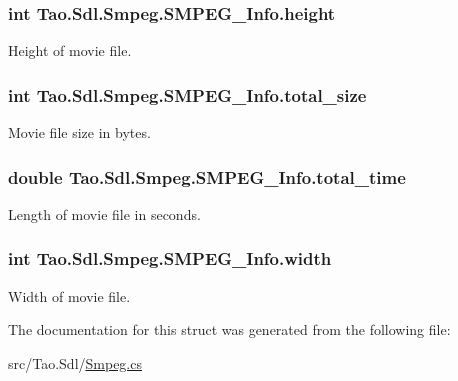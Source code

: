 \label{struct_tao_1_1_sdl_1_1_smpeg_1_1_s_m_p_e_g___info_a1236f01e3011005067459ab30b4d2353}
\hypertarget{struct_tao_1_1_sdl_1_1_smpeg_1_1_s_m_p_e_g___info_ab4c8cb6db1888d1d763dc72c158fd8f3}{
\subsubsection[{height}]{\setlength{\rightskip}{0pt plus 5cm}int {\bf Tao.Sdl.Smpeg.SMPEG\_\-Info.height}}}
\label{struct_tao_1_1_sdl_1_1_smpeg_1_1_s_m_p_e_g___info_ab4c8cb6db1888d1d763dc72c158fd8f3}


Height of movie file. 

\hypertarget{struct_tao_1_1_sdl_1_1_smpeg_1_1_s_m_p_e_g___info_ac5c5e22bebc4d7c6980c1c329316353c}{
\subsubsection[{total\_\-size}]{\setlength{\rightskip}{0pt plus 5cm}int {\bf Tao.Sdl.Smpeg.SMPEG\_\-Info.total\_\-size}}}
\label{struct_tao_1_1_sdl_1_1_smpeg_1_1_s_m_p_e_g___info_ac5c5e22bebc4d7c6980c1c329316353c}


Movie file size in bytes. 

\hypertarget{struct_tao_1_1_sdl_1_1_smpeg_1_1_s_m_p_e_g___info_abc187661fe73006bad98670789d3d756}{
\subsubsection[{total\_\-time}]{\setlength{\rightskip}{0pt plus 5cm}double {\bf Tao.Sdl.Smpeg.SMPEG\_\-Info.total\_\-time}}}
\label{struct_tao_1_1_sdl_1_1_smpeg_1_1_s_m_p_e_g___info_abc187661fe73006bad98670789d3d756}


Length of movie file in seconds. 

\hypertarget{struct_tao_1_1_sdl_1_1_smpeg_1_1_s_m_p_e_g___info_a442b1203f0b9f7b211678c00addb5217}{
\subsubsection[{width}]{\setlength{\rightskip}{0pt plus 5cm}int {\bf Tao.Sdl.Smpeg.SMPEG\_\-Info.width}}}
\label{struct_tao_1_1_sdl_1_1_smpeg_1_1_s_m_p_e_g___info_a442b1203f0b9f7b211678c00addb5217}


Width of movie file. 



The documentation for this struct was generated from the following file:\begin{DoxyCompactItemize}
\item 
src/Tao.Sdl/\hyperlink{_smpeg_8cs}{Smpeg.cs}\end{DoxyCompactItemize}
